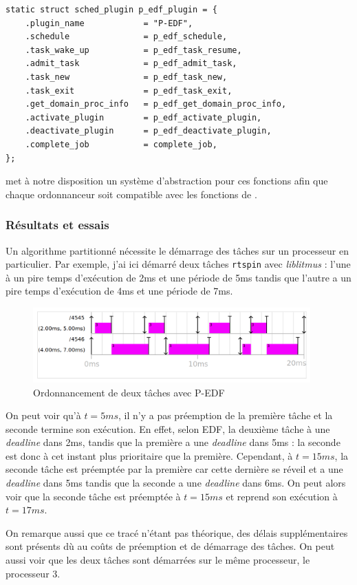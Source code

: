 \begin{lstlisting}[style=cstyle, caption={Déclaration des fonctions de l'ordonnanceur}, label={lst:decl-func-sched}]
static struct sched_plugin p_edf_plugin = {
    .plugin_name            = "P-EDF",
    .schedule               = p_edf_schedule,
    .task_wake_up           = p_edf_task_resume,
    .admit_task             = p_edf_admit_task,
    .task_new               = p_edf_task_new,
    .task_exit              = p_edf_task_exit,
    .get_domain_proc_info   = p_edf_get_domain_proc_info,
    .activate_plugin        = p_edf_activate_plugin,
    .deactivate_plugin      = p_edf_deactivate_plugin,
    .complete_job           = complete_job,
};
\end{lstlisting}

\litmus met à notre disposition un système d'abstraction pour ces fonctions afin que chaque ordonnanceur soit compatible avec les fonctions de \litmus.


\subsubsection{Résultats et essais}

Un algorithme partitionné nécessite le démarrage des tâches sur un processeur en particulier. Par exemple, j'ai ici démarré deux tâches \texttt{rtspin} avec \textit{liblitmus} : l'une à un pire temps d'exécution de 2ms et une période de 5ms tandis que l'autre a un pire temps d'exécution de 4ms et une période de 7ms.

\begin{figure}[H]
    \centering
    \includegraphics[width=0.95\textwidth]{Images/P-EDF-SCHEDUALIBILITY-DEMO.png}
    \caption{Ordonnancement de deux tâches avec P-EDF}
    \label{fig:edf-schedualibility-demo}
\end{figure}

On peut voir qu'à $t=5ms$, il n'y a pas préemption de la première tâche et la seconde termine son exécution. En effet, selon EDF, la deuxième tâche à une \textit{deadline} dans 2ms, tandis que la première a une \textit{deadline} dans 5ms : la seconde est donc à cet instant plus prioritaire que la première. Cependant, à $t=15ms$, la seconde tâche est préemptée par la première car cette dernière se réveil et a une \textit{deadline} dans 5ms tandis que la seconde a une \textit{deadline} dans 6ms. On peut alors voir que la seconde tâche est préemptée à $t=15ms$ et reprend son exécution à $t=17ms$.

On remarque aussi que ce tracé n'étant pas théorique, des délais supplémentaires sont présents dù au coûts de préemption et de démarrage des tâches. On peut aussi voir que les deux tâches sont démarrées sur le même processeur, le processeur 3.